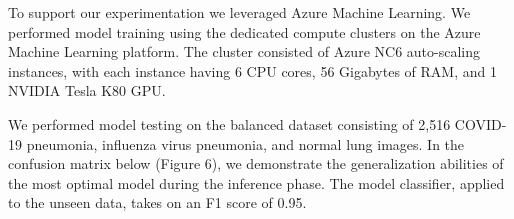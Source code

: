 \documentclass[12pt, twocolumn]{CUP-JNL-PPS}
\begin{document}

To support our experimentation we leveraged Azure Machine Learning.
We performed model training using the dedicated compute clusters on the Azure
Machine Learning platform. The cluster consisted of Azure NC6 auto-scaling instances, with each instance having 6 CPU cores, 56 Gigabytes of RAM, and 1 NVIDIA Tesla K80 GPU.

We performed model testing on the balanced dataset consisting of 2,516
COVID-19 pneumonia, influenza virus pneumonia, and normal lung images. In
the confusion matrix below (Figure 6), we demonstrate the generalization abilities
of the most optimal model during the inference phase. The model classifier,
applied to the unseen data, takes on an F1 score of 0.95.
\end{document}
